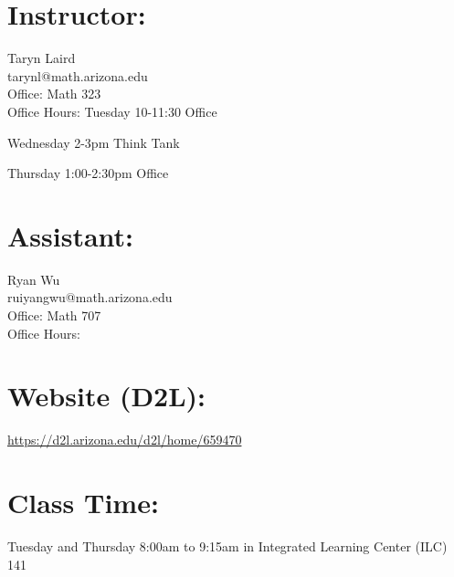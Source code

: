 \documentclass[11pt]{article}
\begin{document}
\hangindent=-2in


\section{\textbf{Instructor:}} 
\vspace{-.65cm}
\hangindent=5cm 
Taryn Laird\\
tarynl@math.arizona.edu\\
Office: Math 323 \\
Office Hours: Tuesday 10-11:30 Office

\hangindent=1.8cm 
\hspace{14em} Wednesday 2-3pm Think Tank

\hangindent=1.8cm 
\hspace{14em} Thursday 1:00-2:30pm Office

\vspace{0.5cm}


\section{\textbf{Assistant:}}
\vspace{-.6cm}
\hangindent=5cm 
Ryan Wu\\
ruiyangwu@math.arizona.edu\\
Office: Math 707\\
Office Hours:

\vspace{0.5cm}


\section{\textbf{Website (D2L):}}
\vspace{-.65cm}
\hangindent=5cm 
\href{https://d2l.arizona.edu/d2l/home/659470}{https://d2l.arizona.edu/d2l/home/659470}

\vspace{0.5cm}


\section{\textbf{Class Time:}}
\vspace{-.65cm}
\hangindent=5cm 
Tuesday and Thursday 8:00am to 9:15am in Integrated Learning Center (ILC) 141
\end{document}
